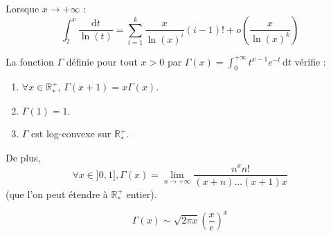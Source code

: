 
	\begin{example}
		Lorsque $x \rightarrow +\infty$ :
		\[ \int_{2}^{x} \frac{\mathrm{d}t}{\ln(t)} = \sum_{i=1}^k \frac{x}{\ln(x)^i} (i-1)! + o \left( \frac{x}{\ln(x)^k} \right) \]
	\end{example}


	\begin{proposition}
		La fonction $\Gamma$ définie pour tout $x > 0$ par $\Gamma(x) = \int_0^{+\infty} t^{x-1} e^{-t} \, \mathrm{d}t$ vérifie :
		\begin{enumerate}[label=(\roman*)]
			\item $\forall x \in \mathbb{R}^+_*$, $\Gamma(x+1) = x\Gamma(x)$.
			\item $\Gamma(1) = 1$.
			\item $\Gamma$ est log-convexe sur $\mathbb{R}^+_*$.
		\end{enumerate}
		De plus,
		\[ \forall x \in ]0, 1], \Gamma(x) = \lim_{n \rightarrow +\infty} \frac{n^x n!}{(x+n) \dots (x+1)x} \]
		(que l'on peut étendre à $\mathbb{R}^+_*$ entier).
	\end{proposition}


	\begin{theorem}
		\[ \Gamma(x) \sim \sqrt{2\pi x} \left( \frac{x}{e} \right)^x \]
	\end{theorem}


